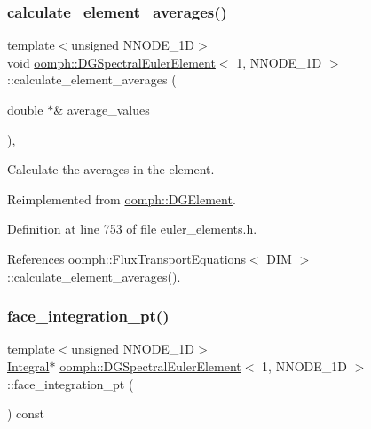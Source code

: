 \subsubsection{\texorpdfstring{calculate\+\_\+element\+\_\+averages()}{calculate\_element\_averages()}}
{\footnotesize\ttfamily template$<$unsigned N\+N\+O\+D\+E\+\_\+1D$>$ \\
void \hyperlink{classoomph_1_1DGSpectralEulerElement}{oomph\+::\+D\+G\+Spectral\+Euler\+Element}$<$ 1, N\+N\+O\+D\+E\+\_\+1D $>$\+::calculate\+\_\+element\+\_\+averages (\begin{DoxyParamCaption}\item[{double $\ast$\&}]{average\+\_\+values }\end{DoxyParamCaption})\hspace{0.3cm}{\ttfamily [inline]}, {\ttfamily [virtual]}}



Calculate the averages in the element. 



Reimplemented from \hyperlink{classoomph_1_1DGElement_a336c61ef405a4710060f177e707c3ec9}{oomph\+::\+D\+G\+Element}.



Definition at line 753 of file euler\+\_\+elements.\+h.



References oomph\+::\+Flux\+Transport\+Equations$<$ D\+I\+M $>$\+::calculate\+\_\+element\+\_\+averages().

\mbox{\label{classoomph_1_1DGSpectralEulerElement_3_011_00_01NNODE__1D_01_4_a793f406d4ada6ec07389bbf74da445c2}} 
\subsubsection{\texorpdfstring{face\+\_\+integration\+\_\+pt()}{face\_integration\_pt()}}
{\footnotesize\ttfamily template$<$unsigned N\+N\+O\+D\+E\+\_\+1D$>$ \\
\hyperlink{classoomph_1_1Integral}{Integral}$\ast$ \hyperlink{classoomph_1_1DGSpectralEulerElement}{oomph\+::\+D\+G\+Spectral\+Euler\+Element}$<$ 1, N\+N\+O\+D\+E\+\_\+1D $>$\+::face\+\_\+integration\+\_\+pt (\begin{DoxyParamCaption}{ }\end{DoxyParamCaption}) const\hspace{0.3cm}{\ttfamily [inline]}}




